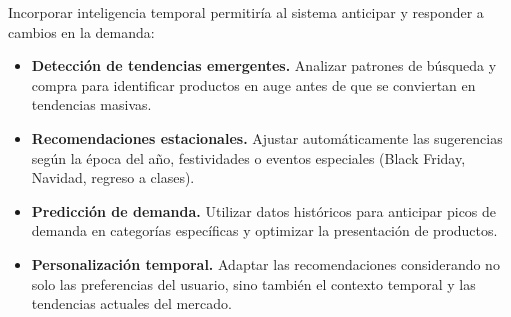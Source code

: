 Incorporar inteligencia temporal permitiría al sistema anticipar y responder a cambios en la demanda:

\begin{itemize}
    \item \textbf{Detección de tendencias emergentes.} Analizar patrones de búsqueda y compra para identificar productos en auge antes de que se conviertan en tendencias masivas.
    \item \textbf{Recomendaciones estacionales.} Ajustar automáticamente las sugerencias según la época del año, festividades o eventos especiales (Black Friday, Navidad, regreso a clases).
    \item \textbf{Predicción de demanda.} Utilizar datos históricos para anticipar picos de demanda en categorías específicas y optimizar la presentación de productos.
    \item \textbf{Personalización temporal.} Adaptar las recomendaciones considerando no solo las preferencias del usuario, sino también el contexto temporal y las tendencias actuales del mercado.
\end{itemize}
